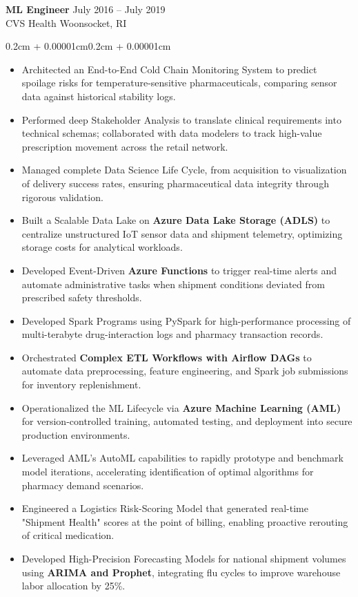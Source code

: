 \documentclass{article}
\newenvironment{highlights}{
    \begin{itemize}[
        topsep=0.10cm, 
        parsep=0.08cm, 
        partopsep=0pt, 
        itemsep=0.08cm, 
        leftmargin=0.4cm + 10pt
    ]
}{
    \end{itemize}
}
\newenvironment{onecolentry}{
    \begin{adjustwidth}{0.2cm + 0.00001cm}{0.2cm + 0.00001cm}
}{
    \end{adjustwidth}
}
\begin{document}
\textbf{ML Engineer} \hfill July 2016 -- July 2019 \\
CVS Health \hfill Woonsocket, RI
\begin{onecolentry}
    \begin{highlights}
        \item Architected an End-to-End Cold Chain Monitoring System to predict spoilage risks for temperature-sensitive pharmaceuticals, comparing sensor data against historical stability logs.
        \item Performed deep Stakeholder Analysis to translate clinical requirements into technical schemas; collaborated with data modelers to track high-value prescription movement across the retail network.
        \item Managed complete Data Science Life Cycle, from acquisition to visualization of delivery success rates, ensuring pharmaceutical data integrity through rigorous validation.
        \item Built a Scalable Data Lake on \textbf{Azure Data Lake Storage (ADLS)} to centralize unstructured IoT sensor data and shipment telemetry, optimizing storage costs for analytical workloads.
        \item Developed Event-Driven \textbf{Azure Functions} to trigger real-time alerts and automate administrative tasks when shipment conditions deviated from prescribed safety thresholds.
        \item Developed Spark Programs using PySpark for high-performance processing of multi-terabyte drug-interaction logs and pharmacy transaction records.
        \item Orchestrated \textbf{Complex ETL Workflows with Airflow DAGs} to automate data preprocessing, feature engineering, and Spark job submissions for inventory replenishment.
        \item Operationalized the ML Lifecycle via \textbf{Azure Machine Learning (AML)} for version-controlled training, automated testing, and deployment into secure production environments.
        \item Leveraged AML’s AutoML capabilities to rapidly prototype and benchmark model iterations, accelerating identification of optimal algorithms for pharmacy demand scenarios.
        \item Engineered a Logistics Risk-Scoring Model that generated real-time "Shipment Health" scores at the point of billing, enabling proactive rerouting of critical medication.
        \item Developed High-Precision Forecasting Models for national shipment volumes using \textbf{ARIMA and Prophet}, integrating flu cycles to improve warehouse labor allocation by 25\%.

\end{highlights}
\end{onecolentry}
\end{document}
